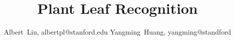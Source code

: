 \documentclass[journal, 10pt]{IEEEtran}
\begin{document}
%
\title{Plant Leaf Recognition}
%
%
%
\author{Albert~Liu, albertpl@stanford.edu
        Yangming~Huang, yangming@standford}%

%
%


\maketitle

\end{document}
